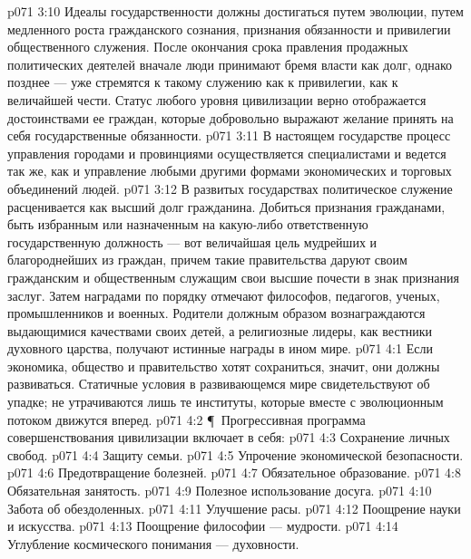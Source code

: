 \vs p071 3:10 Идеалы государственности должны достигаться путем эволюции, путем медленного роста гражданского сознания, признания обязанности и привилегии общественного служения. После окончания срока правления продажных политических деятелей вначале люди принимают бремя власти как долг, однако позднее --- уже стремятся к такому служению как к привилегии, как к величайшей чести. Статус любого уровня цивилизации верно отображается достоинствами ее граждан, которые добровольно выражают желание принять на себя государственные обязанности.
\vs p071 3:11 В настоящем государстве процесс управления городами и провинциями осуществляется специалистами и ведется так же, как и управление любыми другими формами экономических и торговых объединений людей.
\vs p071 3:12 В развитых государствах политическое служение расценивается как высший долг гражданина. Добиться признания гражданами, быть избранным или назначенным на какую\hyp{}либо ответственную государственную должность --- вот величайшая цель мудрейших и благороднейших из граждан, причем такие правительства даруют своим гражданским и общественным служащим свои высшие почести в знак признания заслуг. Затем наградами по порядку отмечают философов, педагогов, ученых, промышленников и военных. Родители должным образом вознаграждаются выдающимися качествами своих детей, а религиозные лидеры, как вестники духовного царства, получают истинные награды в ином мире.
\vs p071 4:1 Если экономика, общество и правительство хотят сохраниться, значит, они должны развиваться. Статичные условия в развивающемся мире свидетельствуют об упадке; не утрачиваются лишь те институты, которые вместе с эволюционным потоком движутся вперед.
\vs p071 4:2 \P\ Прогрессивная программа совершенствования цивилизации включает в себя:
\vs p071 4:3 \bibnobreakspace Сохранение личных свобод.
\vs p071 4:4 \bibnobreakspace Защиту семьи.
\vs p071 4:5 \bibnobreakspace Упрочение экономической безопасности.
\vs p071 4:6 \bibnobreakspace Предотвращение болезней.
\vs p071 4:7 \bibnobreakspace Обязательное образование.
\vs p071 4:8 \bibnobreakspace Обязательная занятость.
\vs p071 4:9 \bibnobreakspace Полезное использование досуга.
\vs p071 4:10 \bibnobreakspace Забота об обездоленных.
\vs p071 4:11 \bibnobreakspace Улучшение расы.
\vs p071 4:12 \bibnobreakspace Поощрение науки и искусства.
\vs p071 4:13 \bibnobreakspace Поощрение философии --- мудрости.
\vs p071 4:14 \bibnobreakspace Углубление космического понимания --- духовности.
